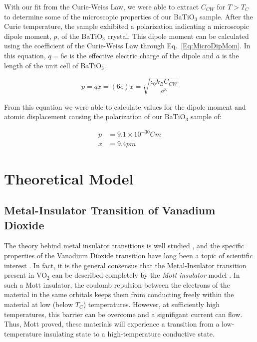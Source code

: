 \documentclass[%
 reprint,
 amsmath,amssymb,
 aps,
 pra,
]{revtex4-1}
\begin{document}
With our fit from the Curie-Weiss Law, we were able to extract $C_{CW}$ for $T > T_{C}$ to determine some of the microscopic properties of our BaTiO$_{3}$ sample. After the Curie temperature, the sample exhibited a polarization indicating a microscopic dipole moment, $p$, of the BaTiO$_{3}$ crystal. This dipole moment can be calculated using the coefficient of the Curie-Weiss Law through Eq.~\ref{Eq:MicroDipMom}. In this equation, $q = 6e$ is the effective electric charge of the dipole and $a$ is the length of the unit cell of BaTiO$_{3}$. 

\begin{equation}\label{Eq:MicroDipMom}
p = qx = (6e)x = \sqrt{\frac{\epsilon_{0} k_{B} C_{CW}}{a^3}}
\end{equation}

\noindent From this equation we were able to calculate values for the dipole moment and atomic displacement causing the polarization of our BaTiO$_{3}$ sample of:

\begin{align*}
p &= 9.1 \times 10^{-30} Cm\\
x &= 9.4 pm
\end{align*}

\section{Theoretical Model}

\subsection{Metal-Insulator Transition of Vanadium Dioxide}

The theory behind metal insulator transitions is well studied \cite{phase_2}, and the specific properties of the Vanadium Dioxide transition have long been a topic of scientific interest \cite{manual, vo2_1, vo2_2}. In fact, it is the general consensus that the Metal-Insulator transition present in VO$_2$ can be described completely by the \textit{Mott insulator} model \cite{manual}. In such a Mott insulator, the coulomb repulsion between the electrons of the material in the same orbitals keeps them from conducting freely within the material at low (below $T_C$) temperatures. However, at sufficiently high temperatures, this barrier can be overcome and a signifigant current can flow. Thus, Mott proved, these materials will experience a transition from a low-temperature insulating state to a high-temperature conductive state.
\end{document}
